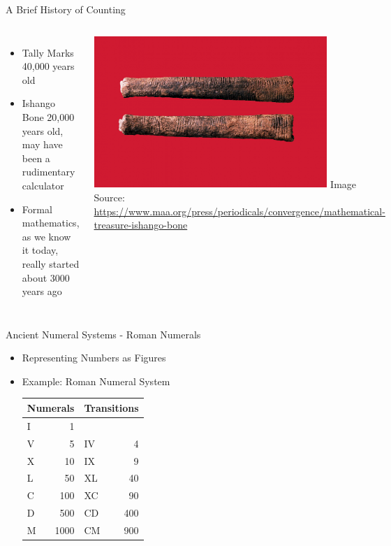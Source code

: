 \documentclass{beamer}
\begin{document}
\begin{frame}{A Brief History of Counting}
\begin{columns}
\begin{itemize}[<+(1)->]
    \item Tally Marks 40,000 years old 
    \item Ishango Bone 20,000 years old, may have been a rudimentary calculator
    \item Formal mathematics, as we know it today, really started about 3000 years ago
\end{itemize}

\includegraphics[width=0.8\textwidth]{images/ishango}
\newline
{\tiny Image Source:
\newline
\url{https://www.maa.org/press/periodicals/convergence/mathematical-treasure-ishango-bone}}

\end{columns}
\end{frame}

\begin{frame}{Ancient Numeral Systems - Roman Numerals}
\begin{itemize}[<+(1)->]
    \item Representing Numbers as Figures
    \item Example: Roman Numeral System
    
    \begin{tabular}{|lr|lr|}
    \hline
    \multicolumn{2}{|c|}{Numerals} & \multicolumn{2}{|c|}{Transitions} \\
    \hline
    I & 1 & &\\
    V & 5 & IV & 4\\
    X & 10 & IX & 9\\
    L & 50 & XL & 40 \\
    C & 100 & XC & 90\\
    D & 500 & CD & 400\\ 
    M & 1000 & CM & 900\\
    \hline
    \end{tabular}
\end{itemize}
\end{frame}
\end{document}
